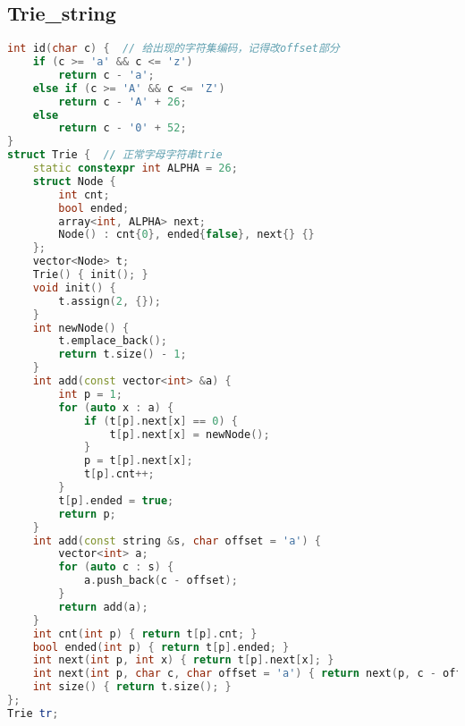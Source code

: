 \subsection{Trie\_string}
\begin{lstlisting}[language=C++]
int id(char c) {  // 给出现的字符集编码，记得改offset部分
    if (c >= 'a' && c <= 'z')
        return c - 'a';
    else if (c >= 'A' && c <= 'Z')
        return c - 'A' + 26;
    else
        return c - '0' + 52;
}
struct Trie {  // 正常字母字符串trie
    static constexpr int ALPHA = 26;
    struct Node {
        int cnt;
        bool ended;
        array<int, ALPHA> next;
        Node() : cnt{0}, ended{false}, next{} {}
    };
    vector<Node> t;
    Trie() { init(); }
    void init() {
        t.assign(2, {});
    }
    int newNode() {
        t.emplace_back();
        return t.size() - 1;
    }
    int add(const vector<int> &a) {
        int p = 1;
        for (auto x : a) {
            if (t[p].next[x] == 0) {
                t[p].next[x] = newNode();
            }
            p = t[p].next[x];
            t[p].cnt++;
        }
        t[p].ended = true;
        return p;
    }
    int add(const string &s, char offset = 'a') {
        vector<int> a;
        for (auto c : s) {
            a.push_back(c - offset);
        }
        return add(a);
    }
    int cnt(int p) { return t[p].cnt; }
    bool ended(int p) { return t[p].ended; }
    int next(int p, int x) { return t[p].next[x]; }
    int next(int p, char c, char offset = 'a') { return next(p, c - offset); }
    int size() { return t.size(); }
};
Trie tr;
\end{lstlisting}
